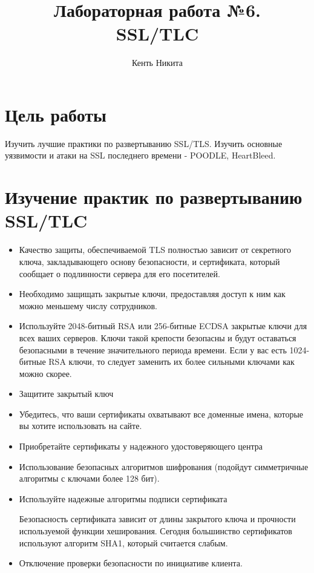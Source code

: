 \documentclass[10pt,a4paper]{report}
\author{Кенть Никита}
\title{Лабораторная работа №6.\\
	SSL/TLC}
\begin{document}
	\maketitle
	\renewcommand{\thesection}{\arabic{section}}
	\tableofcontents
	\pagebreak
	
	\setcounter{totalnumber}{10}
	\setcounter{topnumber}{10}
	\setcounter{bottomnumber}{10}
	\renewcommand{\topfraction}{1}
	\renewcommand{\textfraction}{0}
	
	\section{Цель работы}
		Изучить лучшие практики по развертыванию SSL/TLS.
		Изучить основные уязвимости и атаки на SSL последнего времени - POODLE, 
		HeartBleed.
	\section{Изучение практик по развертыванию SSL/TLC}
		\begin{itemize}
			\item Качество защиты, обеспечиваемой TLS полностью зависит от секретного ключа, закладывающего основу безопасности, и сертификата, который сообщает о подлинности сервера для его посетителей.
			
			\item Необходимо защищать закрытые ключи, предоставляя доступ к ним как 
			можно меньшему числу сотрудников.
			
			\item Используйте 2048-битный RSA или 256-битные ECDSA закрытые ключи для всех ваших серверов. Ключи такой крепости безопасны и будут оставаться безопасными в течение значительного периода времени. Если у вас есть 1024-битные RSA ключи, то следует заменить их более сильными ключами как можно скорее.
			
			\item Защитите закрытый ключ
			
			\item Убедитесь, что ваши сертификаты охватывают все доменные имена, которые вы хотите использовать на сайте. 
			
			\item Приобретайте сертификаты у надежного удостоверяющего центра
			
			\item Использование безопасных алгоритмов шифрования (подойдут 
			симметричные алгоритмы с ключами более 128 бит).
			
			\item  Используйте надежные алгоритмы подписи сертификата

Безопасность сертификата зависит от длины закрытого ключа и прочности используемой функции хеширования. Сегодня большинство сертификатов используют алгоритм SHA1, который считается слабым.

			
			\item Отключение проверки безопасности по инициативе клиента.
		\end{itemize}
\end{document}
